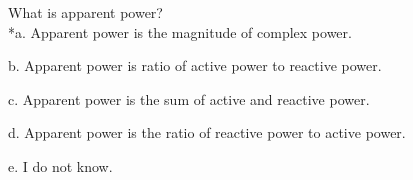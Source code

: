 
What is apparent power?\\

*a. Apparent power is the magnitude of complex power.

b. Apparent power is ratio of active power to reactive power.

c. Apparent power is the sum of active and reactive power.

d. Apparent power is the ratio of reactive power to active power.

e. I do not know.\\

